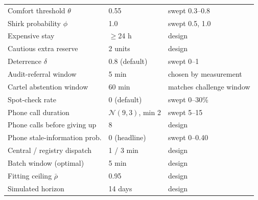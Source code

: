 \begin{table}[!h]
\begin{tabular}{@{}p{2.9cm}p{2.2cm}p{2.6cm}@{}}
Comfort threshold $\theta$ & 0.55 & swept 0.3--0.8 \\
Shirk probability $\phi$ & 1.0 & swept 0.5, 1.0 \\
Expensive stay & $\ge$24 h & design \\
Cautious extra reserve & 2 units & design \\
Deterrence $\delta$ & 0.8 (default) & swept 0--1 \\
Audit-referral window & 5 min & chosen by measurement \\
Cartel abstention window & 60 min & matches challenge window \\
Spot-check rate & 0 (default) & swept 0--30\% \\
Phone call duration & $\mathcal{N}(9,3)$, min 2 & swept 5--15 \\
Phone calls before giving up & 8 & design \\
Phone stale-information prob. & 0 (headline) & swept 0--0.40 \\
Central / registry dispatch & 1 / 3 min & design \\
Batch window (optimal) & 5 min & design \\
Fitting ceiling $\bar\rho$ & 0.95 & design \\
Simulated horizon & 14 days & design \\
\bottomrule
\end{tabular}
\end{table}

